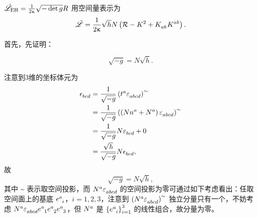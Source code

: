 		\begin{Property}
			$\tilde{\mathscr{L}}_{\text{EH}} = \frac{1}{2\upkappa} \sqrt{- \det g} {R}$ 用空间量表示为
			\begin{equation}
				\Lad = \frac{1}{2\gkappa} \sqrt{h} N \left( \spacecurR - K^2 + \tensor{K}{_a_b} \tensor{K}{^a^b} \right).
			\end{equation}
			
		\end{Property}
		\begin{Proof}
			\label{ap-eq-L_split}
			首先，先证明：
			\begin{Lemma}
				\begin{equation}
					\sqrt{-g} = N\sqrt{h}.
				\end{equation}
				\begin{Proof}
					注意到3维的坐标体元为
					\begin{equation}
						\begin{split}
							\tensor{\nvol}{_b_c_d} &= \frac{1}{\sqrt{-g}} \left( {\tensor{t}{^a} \tensor{\vol}{_a_b_c_d}} \right)\sptilde\\
							&= \frac{1}{\sqrt{-g}} \left( {\left( N \tensor{n}{^a} + \tensor{N}{^a} \right) \tensor{\vol}{_a_b_c_d}} \right)\sptilde\\
							&= \frac{1}{\sqrt{-g}} N \tensor{\vol}{_b_c_d} + 0\\
							&= \frac{\sqrt{h}}{\sqrt{-g}} N \tensor{\nvol}{_b_c_d},
						\end{split}
					\end{equation}
					故
					\begin{equation}
						\sqrt{-g} = N\sqrt{h},
					\end{equation}
					其中 $\sptilde$ 表示取空间投影，而 $\tensor{N}{^a} \tensor{\vol}{_a_b_c_d}$ 的空间投影为零可通过如下考虑看出：任取空间面上的基底 $\tensor{e}{^a_i}$，$i=1,2,3$，注意到 $\left( \tensor{N}{^a} \tensor{\vol}{_a_b_c_d} \right)\sptilde$ 独立分量只有一个，不妨考虑 $\tensor{N}{^a} \tensor{\vol}{_a_b_c_d} \tensor{e}{^a_1} \tensor{e}{^a_2} \tensor{e}{^a_3}$，但 $\tensor{N}{^a}$ 是 $\left\{ \tensor{e}{^a_i} \right\}_{i=1}^3$ 的线性组合，故分量为零。
				\end{Proof}
			\end{Lemma}


\end{Proof}
